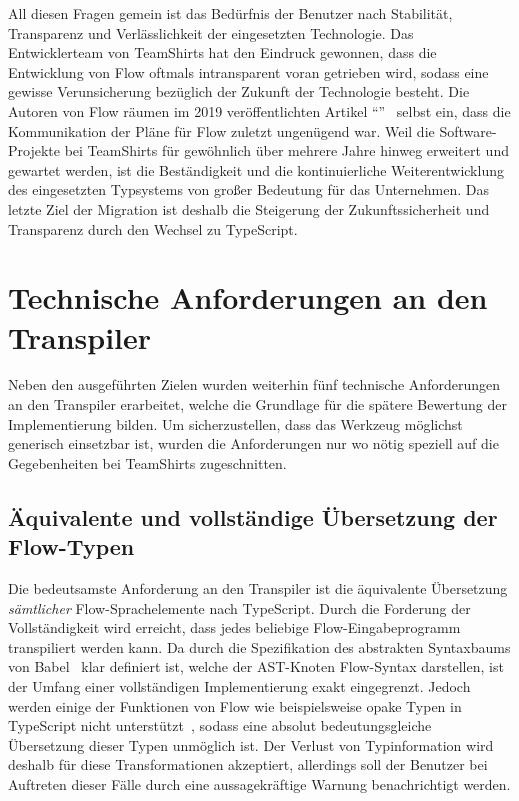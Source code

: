 All diesen Fragen gemein ist das Bedürfnis der Benutzer nach Stabilität, Transparenz und Verlässlichkeit der eingesetzten Technologie. Das Entwicklerteam von TeamShirts hat den Eindruck gewonnen, dass die Entwicklung von Flow oftmals intransparent voran getrieben wird, sodass eine gewisse Verunsicherung bezüglich der Zukunft der Technologie besteht. Die Autoren von Flow räumen im 2019 veröffentlichten Artikel \enquote{}~\autocite{FLOW:UPDATE_2019} selbst ein, dass die Kommunikation der Pläne für Flow zuletzt ungenügend war. Weil die Software-Projekte bei TeamShirts für gewöhnlich über mehrere Jahre hinweg erweitert und gewartet werden, ist die Beständigkeit und die kontinuierliche Weiterentwicklung des eingesetzten Typsystems von großer Bedeutung für das Unternehmen. Das letzte Ziel der Migration ist deshalb die Steigerung der Zukunftssicherheit und Transparenz durch den Wechsel zu TypeScript.

\section{Technische Anforderungen an den Transpiler}
\label{sec:requirements}

Neben den ausgeführten Zielen wurden weiterhin fünf technische Anforderungen an den Transpiler erarbeitet, welche die Grundlage für die spätere Bewertung der Implementierung bilden. Um sicherzustellen, dass das Werkzeug möglichst generisch einsetzbar ist, wurden die Anforderungen nur wo nötig speziell auf die Gegebenheiten bei TeamShirts zugeschnitten.

\subsection{Äquivalente und vollständige Übersetzung der Flow-Typen}
\label{sec:requirement:completeness}

Die bedeutsamste Anforderung an den Transpiler ist die äquivalente Übersetzung \emph{sämtlicher} Flow-Sprachelemente nach TypeScript. Durch die Forderung der Vollständigkeit wird erreicht, dass jedes beliebige Flow-Eingabeprogramm transpiliert werden kann. Da durch die Spezifikation des abstrakten Syntaxbaums von Babel~\autocite{BABEL:PARSER_SPEC} klar definiert ist, welche der AST-Knoten Flow-Syntax darstellen, ist der Umfang einer vollständigen Implementierung exakt eingegrenzt. Jedoch werden einige der Funktionen von Flow wie beispielsweise opake Typen in TypeScript nicht unterstützt~\autocite{TS:GITHUB:NO_OPAQUE_TYPE}, sodass eine absolut bedeutungsgleiche Übersetzung dieser Typen unmöglich ist. Der Verlust von Typinformation wird deshalb für diese Transformationen akzeptiert, allerdings soll der Benutzer bei Auftreten dieser Fälle durch eine aussagekräftige Warnung benachrichtigt werden.

